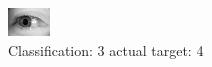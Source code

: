 \begin{figure}[h!]
\begin{center}
\includegraphics[width=0.60\columnwidth]{figures/ID3134_class_3_target_4.png}
\end{center}
\caption{ Classification: 3 actual target: 4}
\label{fig:ID3134_class_3_target_4}
\end{figure}
